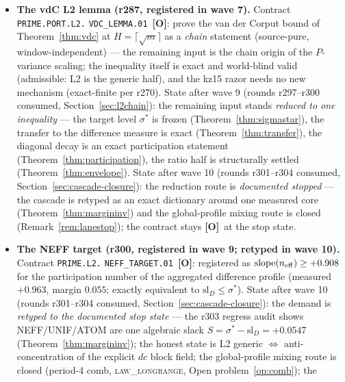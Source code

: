 \documentclass[11pt]{article}
\newcommand{\mO}{\textcolor{openred}{\textbf{[O]}}}
\theoremstyle{definition}
\theoremstyle{remark}
\begin{document}
\begin{itemize}[leftmargin=2em]
two-part demand is executed --- $F_A$ is \emph{de-black-boxed} by
the exact identity $F_A B \log m = m\,q_{\max}$ (the rank-local
normalization of $m\,q_{\max}$, no independent coordinate) and
distributionally bounded (r324-pre banked, envelope $C_F = 3.357$);
the $q_{\max}$-share route composed MEASURED (r324); the sliding
bound itself stays the certified theorem candidate on the measured
rungs.
\item \textbf{The vdC L2 lemma (r287, registered in wave 7).}
Contract \texttt{PRIME.PORT.L2.}\allowbreak
\texttt{VDC\_LEMMA.01}~\mO: prove the van der Corput bound of
Theorem~\ref{thm:vdc} at $H=\lceil\sqrt m\rceil$ as a \emph{chain}
statement (source-pure, window-independent) --- the remaining input is
the chain origin of the $P$-variance scaling; the inequality itself is
exact and world-blind valid (admissible: L2 is the generic half), and
the kz15 razor needs no new mechanism (exact-finite per r270).  State
after wave 9 (rounds r297--r300 consumed,
Section~\ref{sec:l2chain}): the remaining input stands \emph{reduced
to one inequality} --- the target level $\sigma^*$ is frozen
(Theorem~\ref{thm:sigmastar}), the transfer to the difference measure
is exact (Theorem~\ref{thm:transfer}), the diagonal decay is an exact
participation statement (Theorem~\ref{thm:participation}), the ratio
half is structurally settled (Theorem~\ref{thm:envelope}).  State
after wave 10 (rounds r301--r304 consumed,
Section~\ref{sec:cascade-closure}): the reduction route is
\emph{documented stopped} --- the cascade is retyped as an exact
dictionary around one measured core (Theorem~\ref{thm:margininv})
and the global-profile mixing route is closed
(Remark~\ref{rem:lanestop}); the contract stays \mO\ at the stop
state.
\item \textbf{The NEFF target (r300, registered in wave 9; retyped
in wave 10).}  Contract \texttt{PRIME.L2.}\allowbreak
\texttt{NEFF\_TARGET.01}~\mO: registered as
$\mathrm{slope}(n_{\rm eff}) \ge +0.908$ for the participation
number of the aggregated difference profile (measured $+0.963$,
margin $0.055$; exactly equivalent to $\mathrm{sl}_D \le \sigma^*$).
State after wave 10 (rounds r301--r304 consumed,
Section~\ref{sec:cascade-closure}): the demand is \emph{retyped to
the documented stop state} --- the r303 regress audit shows
NEFF/UNIF/ATOM are one algebraic slack $S = \sigma^* - \mathrm{sl}_D
= +0.0547$ (Theorem~\ref{thm:margininv}); the honest state is L2
generic $\Leftrightarrow$ anti-concentration of the explicit $dc$
block field; the global-profile mixing route is closed (period-4
comb, \textsc{law\_longrange}, Open problem~\ref{op:comb}); the

\end{itemize}
\end{document}
